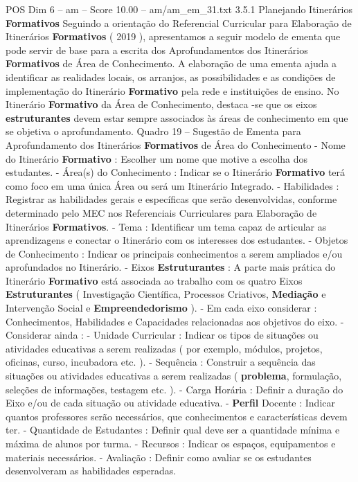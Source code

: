 \begin{textsample}{POS Dim 6 – am – Score 10.00 – am/am\_em\_31.txt}  \label{ex:f6_pos_263}
3.5.1 Planejando Itinerários \textbf{Formativos} Seguindo a orientação do Referencial Curricular para Elaboração de Itinerários \textbf{Formativos} ( 2019 ), apresentamos a seguir modelo de ementa que pode servir de base para a escrita dos Aprofundamentos dos Itinerários \textbf{Formativos} de Área de Conhecimento.
A elaboração de uma ementa ajuda a identificar as realidades locais, os arranjos, as possibilidades e as condições de implementação do Itinerário \textbf{Formativo} pela rede e instituições de ensino.
No Itinerário \textbf{Formativo} da Área de Conhecimento, destaca -se que os eixos \textbf{estruturantes} devem estar sempre associados às áreas de conhecimento em que se objetiva o aprofundamento.
Quadro 19 – Sugestão de Ementa para Aprofundamento dos Itinerários \textbf{Formativos} de Área do Conhecimento - Nome do Itinerário \textbf{Formativo} : Escolher um nome que motive a escolha dos estudantes. - Área(s) do Conhecimento : Indicar se o Itinerário \textbf{Formativo} terá como foco em uma única Área ou será um Itinerário Integrado. - Habilidades : Registrar as habilidades gerais e específicas que serão desenvolvidas, conforme determinado pelo MEC nos Referenciais Curriculares para Elaboração de Itinerários \textbf{Formativos}. - Tema : Identificar um tema capaz de articular as aprendizagens e conectar o Itinerário com os interesses dos estudantes. - Objetos de Conhecimento : Indicar os principais conhecimentos a serem ampliados e/ou aprofundados no Itinerário. - Eixos \textbf{Estruturantes} : A parte mais prática do Itinerário \textbf{Formativo} está associada ao trabalho com os quatro Eixos \textbf{Estruturantes} ( Investigação Científica, Processos Criativos, \textbf{Mediação} e Intervenção Social e \textbf{Empreendedorismo} ). - Em cada eixo considerar : Conhecimentos, Habilidades e Capacidades relacionadas aos objetivos do eixo. - Considerar ainda : - Unidade Curricular : Indicar os tipos de situações ou atividades educativas a serem realizadas ( por exemplo, módulos, projetos, oficinas, curso, incubadora etc. ). - Sequência : Construir a sequência das situações ou atividades educativas a serem realizadas ( \textbf{problema}, formulação, seleções de informações, testagem etc. ). - Carga Horária : Definir a duração do Eixo e/ou de cada situação ou atividade educativa. - \textbf{Perfil} Docente : Indicar quantos professores serão necessários, que conhecimentos e características devem ter. - Quantidade de Estudantes : Definir qual deve ser a quantidade mínima e máxima de alunos por turma. - Recursos : Indicar os espaços, equipamentos e materiais necessários. - Avaliação : Definir como avaliar se os estudantes desenvolveram as habilidades esperadas.

\end{textsample}

